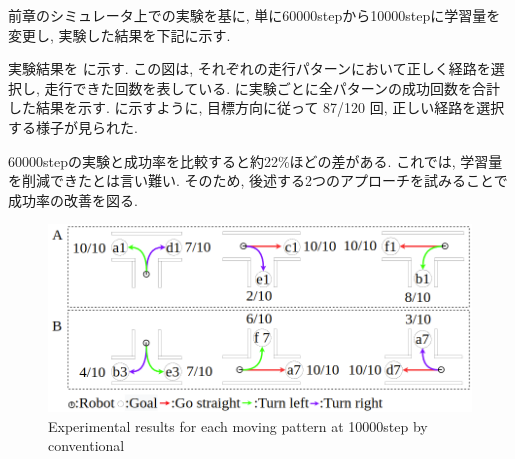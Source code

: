 





前章のシミュレータ上での実験を基に, 単に60000stepから10000stepに学習量を変更し, 実験した結果を下記に示す.

実験結果を  に示す. この図は, それぞれの走行パターンにおいて正しく経路を選択し, 走行できた回数を表している.  に実験ごとに全パターンの成功回数を合計した結果を示す.  に示すように, 目標方向に従って 87/120 回, 正しい経路を選択する様子が見られた.

60000stepの実験と成功率を比較すると約22\%ほどの差がある. これでは, 学習量を削減できたとは言い難い. そのため, 後述する2つのアプローチを試みることで成功率の改善を図る.

\vspace{0.5cm}

\begin{figure}[hbtp]
  \centering
 \includegraphics[keepaspectratio, scale=0.43]
      {images/10000step.png}
 \caption{Experimental results for each moving pattern at 10000step by conventional}
 \label{Fig:10000step}
\end{figure}  

